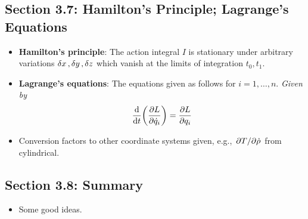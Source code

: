 \documentclass[../notes.tex]{subfiles}
\begin{document}
\subsection*{Section 3.7: Hamilton's Principle; Lagrange's Equations}
\begin{itemize}
    \item \textbf{Hamilton's principle}: The action integral $I$ is stationary under arbitrary variations $\var{x},\var{y},\var{z}$ which vanish at the limits of integration $t_0,t_1$.
    \item \textbf{Lagrange's equations}: The equations given as follows for $i=1,\dots,n$. \emph{Given by}
    \begin{equation*}
        \dv{t}(\pdv{L}{\dot{q}_i}) = \pdv{L}{q_i}
    \end{equation*}
    \item Conversion factors to other coordinate systems given, e.g., $\pdv*{T}{\dot{\rho}}$ from cylindrical.
\end{itemize}


\subsection*{Section 3.8: Summary}
\begin{itemize}
    \item Some good ideas.
\end{itemize}
\end{document}
